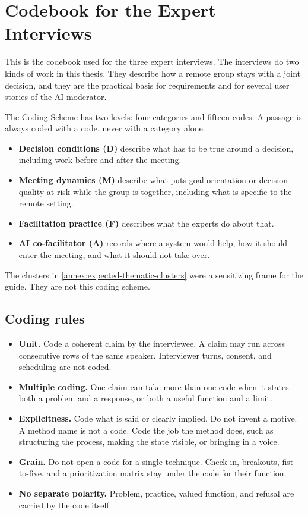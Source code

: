 \section{Codebook for the Expert Interviews}
\label{annex:expert-interview-codebook}

This is the codebook used for the three expert interviews. The interviews do two kinds of work in this thesis.
They describe how a remote group stays with a joint decision, and they are the practical basis
for requirements and for several user stories of the AI moderator.

The Coding-Scheme has two levels: four categories and fifteen codes.
A passage is always coded with a code, never with a category alone.

\begin{itemize}
  \item \textbf{Decision conditions (D)} describe what has to be true around a decision, including
    work before and after the meeting.
  \item \textbf{Meeting dynamics (M)} describe what puts goal orientation or decision quality at
    risk while the group is together, including what is specific to the remote setting.
  \item \textbf{Facilitation practice (F)} describes what the experts do about that.
  \item \textbf{AI co-facilitator (A)} records where a system would help, how it should enter the
    meeting, and what it should not take over.
\end{itemize}

The clusters in \autoref{annex:expected-thematic-clusters} were a sensitizing frame for the guide.
They are not this coding scheme.

\subsection*{Coding rules}

\begin{itemize}
  \item \textbf{Unit.}
    Code a coherent claim by the interviewee. A claim may run across consecutive rows of the same
    speaker. Interviewer turns, consent, and scheduling are not coded.
  \item \textbf{Multiple coding.}
    One claim can take more than one code when it states both a problem and a response, or both a
    useful function and a limit.
  \item \textbf{Explicitness.}
    Code what is said or clearly implied. Do not invent a motive.
    A method name is not a code. Code the job the method does, such as structuring the process,
    making the state visible, or bringing in a voice.
  \item \textbf{Grain.}
    Do not open a code for a single technique. Check-in, breakouts, fist-to-five, and a
    prioritization matrix stay under the code for their function.
  \item \textbf{No separate polarity.}
    Problem, practice, valued function, and refusal are carried by the code itself.
\end{itemize}

